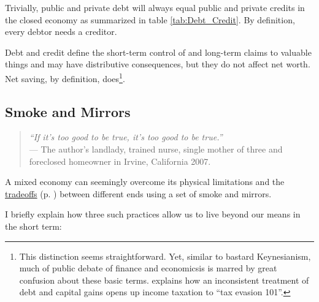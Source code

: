 \begin{enumerate}
	Trivially, public and private debt will always equal public and private credits in the closed economy as summarized in table \ref{tab:Debt_Credit}. By definition, every debtor needs a creditor. 
	
	Debt and credit define the short-term control of and long-term claims to valuable things and may have distributive consequences, but they do not affect net worth. Net saving, by definition, does\footnote{
		This distinction seems straightforward. Yet, similar to bastard Keynesianism, much of public debate of finance and economicsis is marred by great confusion about these basic terms. \citealt{McCaffery2005} explains how an inconsistent treatment of debt and capital gains opens up income taxation to ``tax evasion 101''.}.%
\end{enumerate}

\subsection[Smoke and Mirrors]{Smoke and Mirrors} \label{sec:smoke_n_mirrors}

\begin{quote}
	\emph{``If it's too good to be true, it's too good to be true.''\\}
	--- The author's landlady, trained nurse, single mother of three and foreclosed homeowner in Irvine, California 2007.
\end{quote}

A mixed economy can seemingly overcome its physical limitations and the \hyperref[sec:tradeoffs]{tradeoffs} (p. \pageref{sec:tradeoffs}) between different ends using a set of smoke and mirrors. 

I briefly explain how three such practices allow us to live beyond our means in the short term:

